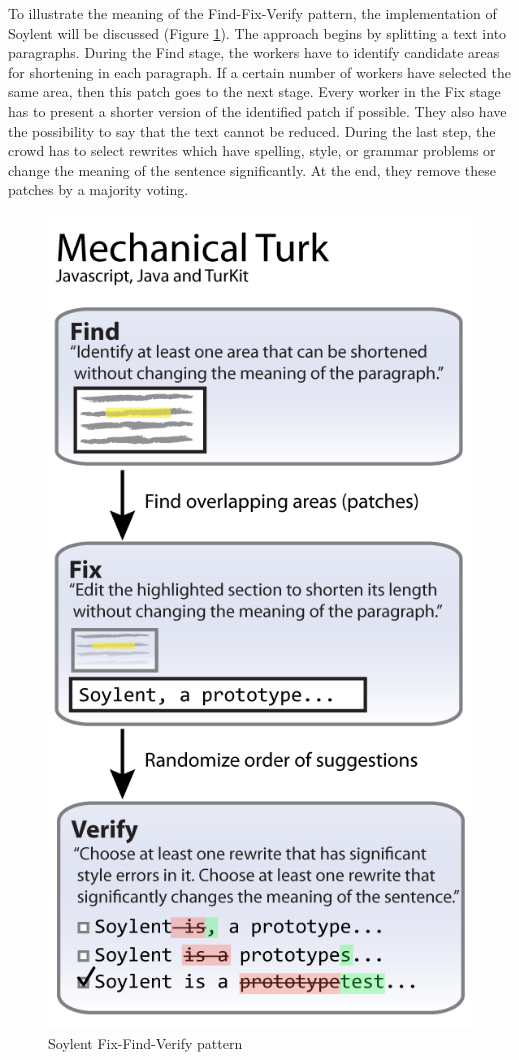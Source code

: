 To illustrate the meaning of the Find-Fix-Verify pattern, the implementation of Soylent will be discussed (Figure \ref{fixfindverify}). The approach begins by splitting a text into paragraphs. During the Find stage, the workers have to identify candidate areas for shortening in each paragraph. If a certain number of workers have selected the same area, then this patch goes to the next stage. Every worker in the Fix stage has to present a shorter version of the identified patch if possible. They also have the possibility to say that the text cannot be reduced. During the last step, the crowd has to select rewrites which have spelling, style, or grammar problems or change the meaning of the sentence significantly. At the end, they remove these patches by a majority voting.
\begin{figure}[h!]
\centering
\includegraphics[scale=0.35]{images/soylent_system_overview.png}
\caption{Soylent Fix-Find-Verify pattern}
\label{fixfindverify}
\end{figure}

